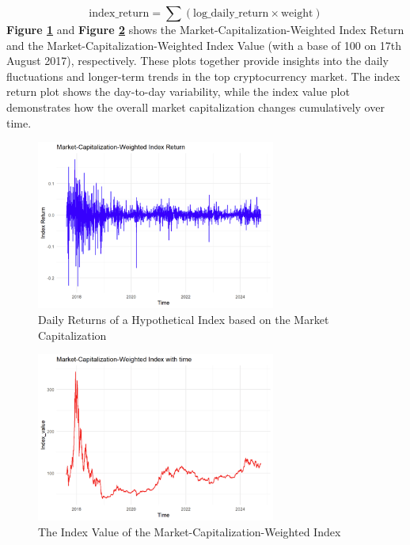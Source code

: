 \documentclass{article}
\begin{document}
\[
\text{index\_return} = \sum (\text{log\_daily\_return} \times \text{weight}) \tag{Equation 2}
\]
{\bf Figure \ref{Market-Capitalization-Weighted Index Return}} and {\bf Figure \ref{Market-Capitalization-Weighted Index Value}} shows the Market-Capitalization-Weighted Index Return and the Market-Capitalization-Weighted Index Value (with a base of 100 on 17th August 2017), respectively. These plots together provide insights into the daily fluctuations and longer-term trends in the top cryptocurrency market. The index return plot shows the day-to-day variability, while the index value plot demonstrates how the overall market capitalization changes cumulatively over time.

\begin{figure}[h]
    \centering
    \includegraphics[width=0.7\textwidth]{4.png}
     \caption{Daily Returns of a Hypothetical Index based on the Market Capitalization}
    \label{Market-Capitalization-Weighted Index Return}
\end{figure}
\begin{figure}[h]
    \centering
    \includegraphics[width=0.7\textwidth]{5.png}
     \caption{The Index Value of the Market-Capitalization-Weighted Index}
    \label{Market-Capitalization-Weighted Index Value}
\end{figure}
\end{document}
